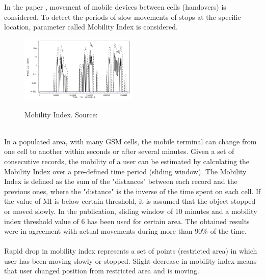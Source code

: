 In the paper \cite{MobilityIndexGIS}, movement of mobile devices between cells (handovers) is considered. To detect the periods of slow movements of stops at the specific location, parameter called Mobility Index is considered. 
\begin{figure}[!ht]
	\centering
	\includegraphics[width=0.5\textwidth]{images/intro_mobility_index.png}\\
	\caption{Mobility Index. Source: \cite{MobilityIndexGIS}}
	\label{fig:introduction_mob_index}
\end{figure}
\\
In a populated area, with many GSM cells, the mobile
terminal can change from one cell to another within
seconds or after several minutes. Given a set of consecutive records, the mobility of a user can be estimated by calculating the Mobility Index over a pre-defined time period (sliding window). The Mobility Index is defined as the sum of the "distances" between each record and the previous ones, where the "distance" is the inverse of the time spent on each cell. If the value of MI is below certain threshold, it is assumed that the object stopped or moved slowly. In the publication, sliding window of 10 minutes and a mobility index threshold value of 6 has been used for certain area. The obtained results were in agreement with actual movements during more than 90\% of the time. 
\\\\
Rapid drop in mobility index represents a set of points (restricted area) in which user has been moving slowly or stopped. Slight decrease in mobility index means that user changed position from restricted area and is moving.